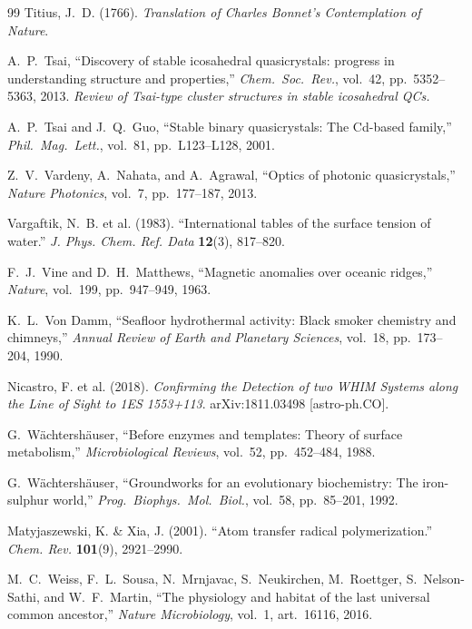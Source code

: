 \documentclass[12pt,oneside]{book}
\theoremstyle{principia}
\theoremstyle{definition}
\theoremstyle{remark}
\begin{document}
\begin{thebibliography}{99}
Titius, J.~D. (1766).
\textit{Translation of Charles Bonnet's Contemplation of Nature}.

A.~P.~Tsai,
``Discovery of stable icosahedral quasicrystals: progress in understanding structure and properties,''
\emph{Chem.\ Soc.\ Rev.}, vol.~42, pp.~5352--5363, 2013.
\textit{Review of Tsai-type cluster structures in stable icosahedral QCs.}

A.~P.~Tsai and J.~Q.~Guo,
``Stable binary quasicrystals: The Cd-based family,''
\emph{Phil.\ Mag.\ Lett.}, vol.~81, pp.~L123--L128, 2001.

Z.~V.~Vardeny, A.~Nahata, and A.~Agrawal,
``Optics of photonic quasicrystals,''
\emph{Nature Photonics}, vol.~7, pp.~177--187, 2013.

Vargaftik, N.~B. et al. (1983).
``International tables of the surface tension of water.''
\textit{J. Phys. Chem. Ref. Data} \textbf{12}(3), 817--820.

F.~J.~Vine and D.~H.~Matthews,
``Magnetic anomalies over oceanic ridges,''
\emph{Nature}, vol.~199, pp.~947--949, 1963.

K.~L.~Von Damm,
``Seafloor hydrothermal activity: Black smoker chemistry and chimneys,''
\emph{Annual Review of Earth and Planetary Sciences}, vol.~18, pp.~173--204, 1990.

Nicastro, F. et al. (2018).
\textit{Confirming the Detection of two WHIM Systems along the Line of Sight to 1ES 1553+113}.
arXiv:1811.03498 [astro-ph.CO].

G.~W\"achtersh\"auser,
``Before enzymes and templates: Theory of surface metabolism,''
\emph{Microbiological Reviews}, vol.~52, pp.~452--484, 1988.

G.~W\"achtersh\"auser,
``Groundworks for an evolutionary biochemistry: The iron-sulphur world,''
\emph{Prog.\ Biophys.\ Mol.\ Biol.}, vol.~58, pp.~85--201, 1992.

Matyjaszewski, K. \& Xia, J. (2001).
``Atom transfer radical polymerization.''
\textit{Chem. Rev.} \textbf{101}(9), 2921--2990.

M.~C.~Weiss, F.~L.~Sousa, N.~Mrnjavac, S.~Neukirchen, M.~Roettger,
S.~Nelson-Sathi, and W.~F.~Martin,
``The physiology and habitat of the last universal common ancestor,''
\emph{Nature Microbiology}, vol.~1, art.~16116, 2016.


\end{thebibliography}
\end{document}
